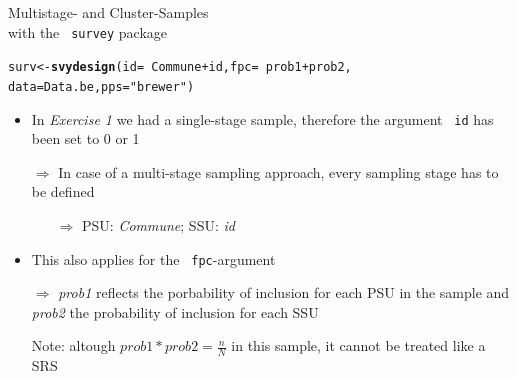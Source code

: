 \documentclass[11pt,german,hideothersubsections]{beamer}\usepackage[]{graphicx}\usepackage[]{color}
\makeatletter
\newcommand{\hlstr}[1]{\textcolor[rgb]{0.192,0.494,0.8}{#1}}%
\newcommand{\hlopt}[1]{\textcolor[rgb]{0,0,0}{#1}}%
\newcommand{\hlstd}[1]{\textcolor[rgb]{0.345,0.345,0.345}{#1}}%
\newcommand{\hlkwb}[1]{\textcolor[rgb]{0.69,0.353,0.396}{#1}}%
\newcommand{\hlkwc}[1]{\textcolor[rgb]{0.333,0.667,0.333}{#1}}%
\newcommand{\hlkwd}[1]{\textcolor[rgb]{0.737,0.353,0.396}{\textbf{#1}}}%
\newenvironment{kframe}{%
 \def\at@end@of@kframe{}%
 \ifinner\ifhmode%
  \def\at@end@of@kframe{\end{minipage}}%
  \begin{minipage}{\columnwidth}%
 \fi\fi%
 \def\FrameCommand##1{\hskip\@totalleftmargin \hskip-\fboxsep
 \colorbox{shadecolor}{##1}\hskip-\fboxsep
     \hskip-\linewidth \hskip-\@totalleftmargin \hskip\columnwidth}%
 \MakeFramed {\advance\hsize-\width
   \@totalleftmargin\z@ \linewidth\hsize
   \@setminipage}}%
 {\par\unskip\endMakeFramed%
 \at@end@of@kframe}
\newenvironment{knitrout}{}{} %
\newcommand{\R}[1]{{\tt \color{blue}  #1}}
\makeatother
\begin{document}
\begin{frame}[fragile]{Multistage- and Cluster-Samples \\ with the \R{survey} package}

\begin{knitrout}
\color{fgcolor}\begin{kframe}
\begin{alltt}
\hlstd{surv} \hlkwb{<-} \hlkwd{svydesign}\hlstd{(}\hlkwc{id}\hlstd{=}\hlopt{~}\hlstd{Commune}\hlopt{+}\hlstd{id,}\hlkwc{fpc}\hlstd{=}\hlopt{~}\hlstd{prob1}\hlopt{+}\hlstd{prob2,}
                  \hlkwc{data}\hlstd{=Data.be,}\hlkwc{pps}\hlstd{=}\hlstr{"brewer"}\hlstd{)}
\end{alltt}
\end{kframe}
\end{knitrout}

\begin{itemize}
\item In \emph{Exercise 1} we had a single-stage sample, therefore the argument \R{id} has been set to 0 or 1
\item[$\Rightarrow$] In case of a multi-stage sampling approach, every sampling stage has to be defined
\begin{itemize}
\item[$\Rightarrow$] PSU: \emph{Commune}; SSU: \emph{id}
\end{itemize}
\item This also applies for the \R{fpc}-argument 
\item[$\Rightarrow$] \emph{prob1} reflects the porbability of inclusion for each PSU in the sample and \emph{prob2} the probability of inclusion for each SSU
\item[] \alert{Note:} altough $prob1*prob2=\frac{n}{N}$ in this sample, it cannot be treated like a SRS

\end{itemize}



\end{frame}
\end{document}
